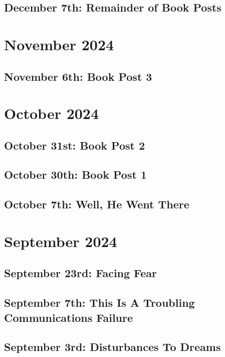 \documentclass[12pt,letterpaper]{report}
\begin{document}
\subsection{December 7th: Remainder of Book Posts}

\section{November 2024}
\subsection{November 6th: Book Post 3}

\section{October 2024}
\subsection{October 31st: Book Post 2}

\subsection{October 30th: Book Post 1}

\subsection{October 7th: Well, He Went There}

\section{September 2024}
\subsection{September 23rd: Facing Fear}

\subsection{September 7th: This Is A Troubling Communications Failure}

\subsection{September 3rd: Disturbances To Dreams}

\end{document}
